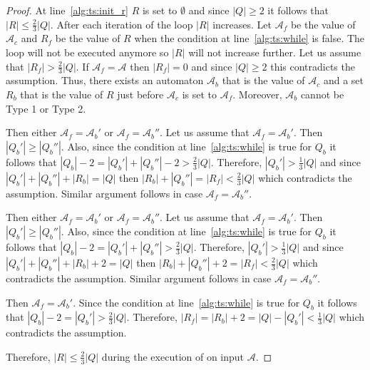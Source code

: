 \begin{proof}
  At line~\ref{alg:ts:init_r} $R$ is set to $\emptyset$ and since $|Q| \geq 2$ it follows that
  $|R| \leq \frac{2}{3} |Q|$. After each iteration of the loop $|R|$ increases.
  Let $\mathcal{A}_f$ be the value of $\mathcal{A}_c$ and $R_f$ be the value
  of $R$ when the condition at line~\ref{alg:ts:while} is false. The loop will not be executed
  anymore so $|R|$ will not increase further. Let us assume that $|R_f| >
    \frac{2}{3} |Q|$. If $\mathcal{A}_f = \mathcal{A}$ then $|R_f| = 0$
  and since $|Q| \geq 2$ this contradicts the assumption. Thus, there exists
  an automaton $\mathcal{A}_b$ that is the value of $\mathcal{A}_c$ and a set
  $R_b$ that is the value of $R$ just before $\mathcal{A}_c$ is set to
  $\mathcal{A}_f$. Moreover, $\mathcal{A}_b$ cannot be Type 1 or Type 2.

  \begin{case}
    Then either $\mathcal{A}_f = \mathcal{A}_b'$ or $\mathcal{A}_f =
      \mathcal{A}_b''$. Let us assume that $\mathcal{A}_f =
      \mathcal{A}_b'$. Then $|Q_b'| \geq |Q_b''|$. Also, since the
    condition at line~\ref{alg:ts:while} is true for $Q_b$ it follows that $|Q_b| - 2 =
      |Q_b'| + |Q_b''| - 2 > \frac{2}{3} |Q|$. Therefore, $|Q_b'| >
      \frac{1}{3} |Q|$ and since $|Q_b'| + |Q_b''| + |R_b| = |Q|$ then
    $|R_b| + |Q_b''| = |R_f| < \frac{2}{3} |Q|$ which contradicts the
    assumption. Similar argument follows in case $\mathcal{A}_f =
      \mathcal{A}_b''$.
  \end{case}

  \begin{case}
    Then either $\mathcal{A}_f = \mathcal{A}_b'$ or $\mathcal{A}_f =
      \mathcal{A}_b''$. Let us assume that $\mathcal{A}_f =
      \mathcal{A}_b'$. Then $|Q_b'| \geq |Q_b''|$. Also, since the
    condition at line~\ref{alg:ts:while} is true for $Q_b$ it follows that $|Q_b| - 2 =
      |Q_b'| + |Q_b''| > \frac{2}{3} |Q|$. Therefore, $|Q_b'| >
      \frac{1}{3} |Q|$ and since $|Q_b'| + |Q_b''| + |R_b| + 2 = |Q|$ then
    $|R_b| + |Q_b''| + 2 = |R_f| < \frac{2}{3} |Q|$ which contradicts
    the assumption. Similar argument follows in case $\mathcal{A}_f =
      \mathcal{A}_b''$.
  \end{case}

  \begin{case}
    Then $\mathcal{A}_f = \mathcal{A}_b'$. Since the condition at line~\ref{alg:ts:while}
    is true for $Q_b$ it follows that $|Q_b| - 2 = |Q_b'| > \frac{2}{3}
      |Q|$. Therefore, $|R_f| = |R_b| + 2 = |Q| - |Q_b'| < \frac{1}{3} |Q|$
    which contradicts the assumption.
  \end{case}

  \noindent
  Therefore, $|R| \leq \frac{2}{3} |Q|$ during the execution of
   on input $\mathcal{A}$.
\end{proof}

